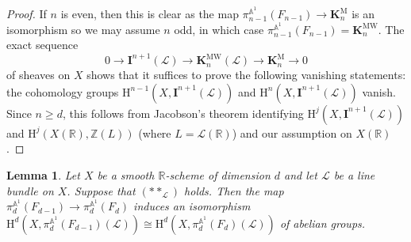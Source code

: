 \documentclass[11pt,leqno]{amsart}
\renewcommand{\1}{{\rm 1\hspace*{-0.4ex}%
\rule{0.1ex}{1.52ex}\hspace*{0.2ex}}}
\renewcommand{\Lc}{{\mathcal L}}
\newcommand{\Hr}{{\mathrm {H}}}
\newcommand{\<}[1]{{\langle}#1 {\rangle}}
\newcommand{\Ibf}{\mathbf{I}}
\newcommand{\Rb}{\mathbb{R}}
\newcommand{\Zb}{\mathbb{Z}}
\newcommand{\Kbf}{\mathbf{K}}
\newcommand{\Abb}{\mathbb{A}}
\newcommand{\Mr}{\mathrm{M}}
\newcommand{\MW}{\mathrm{MW}}
\theoremstyle{plain}
\newtheorem{lem}[thm]{Lemma}
\theoremstyle{definition}
\theoremstyle{remark}
\numberwithin{equation}{section}
\begin{document}
\begin{proof}
If $n$ is even, then this is clear as the map $\pi_{n-1}^{\Abb^1}(F_{n-1})\to\Kbf_n^\Mr$ is an isomorphism so we may assume $n$ odd, in which case $\pi_{n-1}^{\Abb^1}(F_{n-1})=\Kbf_n^\MW$. The exact sequence \[0\to\Ibf^{n+1}(\Lc)\to\Kbf_n^\MW(\Lc)\to\Kbf_n^\Mr\to 0\] of sheaves on $X$ shows that it suffices to prove the following vanishing statements: the cohomology groups $\Hr^{n-1}(X,\Ibf^{n+1}(\Lc))$ and $\Hr^{n}(X,\Ibf^{n+1}(\Lc))$ vanish. Since $n\geq d$, this follows from Jacobson's theorem \cite[Corollary 8.11]{jacobsonRealCohomologyPowers2017} identifying $\Hr^j(X,\Ibf^{n+1}(\Lc))$ and $\Hr^j(X(\Rb),\Zb(L))$ (where $L=\Lc(\Rb)$) and our assumption on $X(\Rb)$. 
\end{proof}

\begin{lem}\label{lem:iso_homotopy_sheaves_of_fibres}
Let $X$ be a smooth $\Rb$-scheme of dimension $d$ and let $\Lc$ be a line bundle on $X$. Suppose that $(**_\Lc)$ holds. Then the map $\pi_d^{\Abb^1}(F_{d-1})\to\pi_d^{\Abb^1}(F_d)$ induces an isomorphism $\Hr^d(X,\pi_d^{\Abb^1}(F_{d-1})(\Lc))\cong\Hr^d(X,\pi_d^{\Abb^1}(F_{d})(\Lc))$ of abelian groups.
\end{lem}
\end{document}
